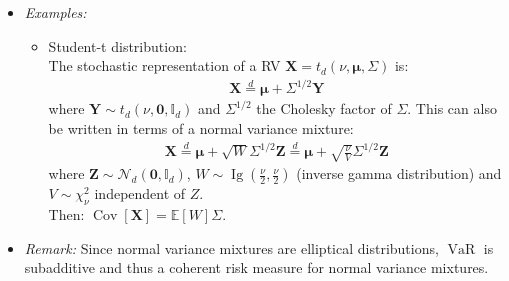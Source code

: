 \documentclass[a4paper,landscape,8pt,fleqn]{scrartcl}
\DeclareMathOperator{\Cov}{Cov}				%
\DeclareMathOperator{\Ig}{Ig}					%
\DeclareMathOperator{\VaR}{VaR}				%
\begin{document}
\begin{multicols*}{3}
\begin{itemize}
\item \textit{Examples:}
\begin{itemize}
\item Student-t distribution: \\
The stochastic representation of a RV $\bm X = t_d(\nu, \bm \mu, \Sigma)$ is:
\begin{align*}
\bm X \overset{d}{=} \bm \mu + \Sigma^{1/2} \bm Y
\end{align*}
where $\bm Y \sim t_d(\nu, \bm 0, \mathbb{I}_d)$ and $\Sigma^{1/2}$ the Cholesky factor of $\Sigma$.
This can also be written in terms of a normal variance mixture:
\begin{align*}
\bm X \overset{d}{=} \bm \mu + \sqrt{W} \Sigma^{1/2} \bm Z \overset{d}{=} \bm \mu + \sqrt{\frac{\nu}{V}} \Sigma^{1/2} \bm Z 
\end{align*}
where $\bm Z \sim \mathcal{N}_d(\bm 0, \mathbb{I}_d)$, $W \sim \Ig(\frac{\nu}{2}, \frac{\nu}{2})$ (inverse gamma distribution) and $V \sim \chi_\nu^2$ independent of $Z$. \\
Then: $\Cov[\bm X] = \mathbb{E}[W] \Sigma$.
\end{itemize}
\item \textit{Remark:} Since normal variance mixtures are elliptical distributions, $\VaR$ is subadditive and thus a coherent risk measure for normal variance mixtures.
\end{itemize}


\end{multicols*}
\end{document}
